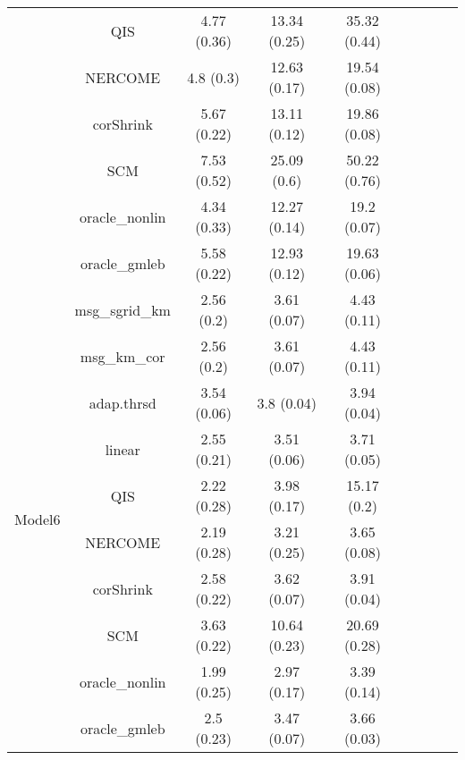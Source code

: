 \documentclass[useAMS,referee,usenatbib]{biom}
\begin{document}
\begin{table}[H]
{\begin{tabular}{ccccccccc}
 & QIS            & 4.77 (0.36) & 13.34 (0.25) & 35.32 (0.44) \\
 & NERCOME        & 4.8 (0.3)   & 12.63 (0.17) & 19.54 (0.08) \\
 & corShrink      & 5.67 (0.22) & 13.11 (0.12) & 19.86 (0.08) \\
 & SCM            & 7.53 (0.52) & 25.09 (0.6)  & 50.22 (0.76) \\
 & oracle\_nonlin & 4.34 (0.33) & 12.27 (0.14) & 19.2 (0.07)  \\
 & oracle\_gmleb  & 5.58 (0.22) & 12.93 (0.12) & 19.63 (0.06) \\  \midrule
\multirow{10}{*}{Model6}  
 & msg\_sgrid\_km & 2.56 (0.2)  & 3.61 (0.07)  & 4.43 (0.11)  \\
 & msg\_km\_cor   & 2.56 (0.2)  & 3.61 (0.07)  & 4.43 (0.11)  \\
 & adap.thrsd     & 3.54 (0.06) & 3.8 (0.04)   & 3.94 (0.04)  \\
 & linear         & 2.55 (0.21) & 3.51 (0.06)  & 3.71 (0.05)  \\
 & QIS            & 2.22 (0.28) & 3.98 (0.17)  & 15.17 (0.2)  \\
 & NERCOME        & 2.19 (0.28) & 3.21 (0.25)  & 3.65 (0.08)  \\
 & corShrink      & 2.58 (0.22) & 3.62 (0.07)  & 3.91 (0.04)  \\
 & SCM            & 3.63 (0.22) & 10.64 (0.23) & 20.69 (0.28) \\
 & oracle\_nonlin & 1.99 (0.25) & 2.97 (0.17)  & 3.39 (0.14)  \\
 & oracle\_gmleb  & 2.5 (0.23)  & 3.47 (0.07)  & 3.66 (0.03) \\ \bottomrule
\end{tabular}%
}
\end{table}
\end{document}
